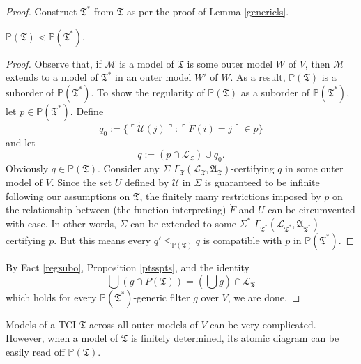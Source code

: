\documentclass[12pt]{article}
\numberwithin{equation}{section}
\begin{document}
\begin{proof}
Construct $\mathfrak{T}^*$ from $\mathfrak{T}$ as per the proof of Lemma \ref{genericls}.

\begin{prop}\label{ptsspts}
$\mathbb{P}(\mathfrak{T}) \lessdot \mathbb{P}(\mathfrak{T}^*)$.
\end{prop}

\begin{proof}
Observe that, if $\mathcal{M}$ is a model of $\mathfrak{T}$ is some outer model $W$ of $V$, then $\mathcal{M}$ extends to a model of $\mathfrak{T}^*$ in an outer model $W'$ of $W$. As a result, $\mathbb{P}(\mathfrak{T})$ is a suborder of $\mathbb{P}(\mathfrak{T}^*)$. To show the regularity of $\mathbb{P}(\mathfrak{T})$ as a suborder of $\mathbb{P}(\mathfrak{T}^*)$, let $p \in \mathbb{P}(\mathfrak{T}^*)$. Define $$q_0 := \{\ulcorner \dot{\mathcal{U}}(j) \urcorner : \ulcorner \dot{F}(i) = j \urcorner \in p\}$$ and let $$q := (p \cap \mathcal{L}_{\mathfrak{T}}) \cup q_0.$$ Obviously $q \in \mathbb{P}(\mathfrak{T})$. Consider any $\Sigma$ $\Gamma_{\mathfrak{T}} (\mathcal{L}_{\mathfrak{T}}, \mathfrak{A}_{\mathfrak{T}})$-certifying $q$ in some outer model of $V$. Since the set $U$ defined by $\dot{\mathcal{U}}$ in $\Sigma$ is guaranteed to be infinite following our assumptions on $\mathfrak{T}$, the finitely many restrictions imposed by $p$ on the relationship between (the function interpreting) $\dot{F}$ and $U$ can be circumvented with ease. In other words, $\Sigma$ can be extended to some $\Sigma^*$ $\Gamma_{\mathfrak{T}^*} (\mathcal{L}_{\mathfrak{T}^*}, \mathfrak{A}_{\mathfrak{T}^*})$-certifying $p$. But this means every $q' \leq_{\mathbb{P}(\mathfrak{T})} q$ is compatible with $p$ in $\mathbb{P}(\mathfrak{T}^*)$.
\end{proof}

By Fact \ref{regsubo}, Proposition \ref{ptsspts}, and the identity
\begin{equation*}
    \bigcup (g \cap P(\mathfrak{T})) = (\bigcup g) \cap \mathcal{L}_{\mathfrak{T}}
\end{equation*}
which holds for every $\mathbb{P}(\mathfrak{T}^*)$-generic filter $g$ over $V$, we are done.
\end{proof}

Models of a TCI $\mathfrak{T}$ across all outer models of $V$ can be very complicated. However, when a model of $\mathfrak{T}$ is finitely determined, its atomic diagram can be easily read off $\mathbb{P}(\mathfrak{T})$.
\end{document}
